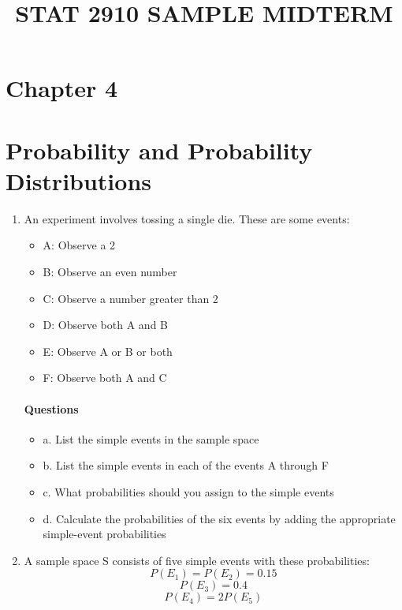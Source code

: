 \documentclass{article}
\title{STAT 2910 SAMPLE MIDTERM}
\begin{document}
\maketitle

\section*{Chapter 4}
\section*{Probability and Probability Distributions}

\begin{enumerate}
    \item An experiment involves tossing a single die. These are some events:
    \begin{itemize}
    \item A: Observe a 2
    \item B: Observe an even number
    \item C: Observe a number greater than 2
    \item D: Observe both A and B
    \item E: Observe A or B or both
    \item F: Observe both A and C
    \end{itemize}
\paragraph*{Questions}
    \begin{itemize}
    \item a. List the simple events in the sample space
    \item b. List the simple events in each of the events A through F
    \item c. What probabilities should you assign to the simple events
    \item d. Calculate the probabilities of the six events by adding the appropriate simple-event probabilities
    \end{itemize}
    \item A sample space S consists of five simple events with these probabilities:
    $$P(E_1) = P(E_2) = 0.15$$
    $$P(E_3) = 0.4$$
    $$P(E_4) = 2P(E_5)$$

\end{enumerate}
\end{document}
